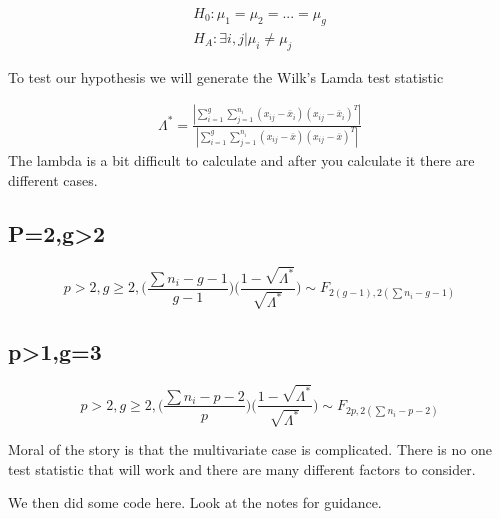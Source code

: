 \begin{gather}
    H_0: \mu_1=\mu_2=...=\mu_g\\
    H_A: \exists i,j| \mu_i\neq \mu_j 
\end{gather}

To test our hypothesis we will generate the Wilk's Lamda test statistic

\begin{gather*}
    \Lambda^* = \frac
    {|
    \displaystyle\sum_{i=1}^g
    \displaystyle\sum_{j=1}^{n_i}(x_{ij}-\overline{x}_i)(x_{ij}-\overline{x}_i)^T|
    }
    {|\displaystyle\sum_{i=1}^g
    \displaystyle\sum_{j=1}^{n_i} (x_{ij}-\overline{x}
    )(x_{ij}-\overline{x}
    )^T|
    }
\end{gather*}
The lambda is a bit difficult to calculate and after you calculate it there are different cases.

\subsection{P=2,g>2}
\[p>2,g\geq 2, \Big ( \frac{\sum n_i - g-1}{g-1} \Big ) \Big (\frac{1-\sqrt{\Lambda^*}}{\sqrt{\Lambda^*}} \Big )\sim F_{2(g-1),2(\sum n_i-g-1)}\]
\subsection{p>1,g=3}
\[p>2,g\geq 2, \Big( \frac{\sum n_i - p-2}{p} \Big) \Big( \frac{1-\sqrt{\Lambda^*}}{\sqrt{\Lambda^*}} \Big)\sim F_{2p,2(\sum n_i-p-2)}\]

Moral of the story is that the multivariate case is complicated. There is no one test statistic that will work and there are many different factors to consider.

We then did some code here. Look at the notes for guidance.
